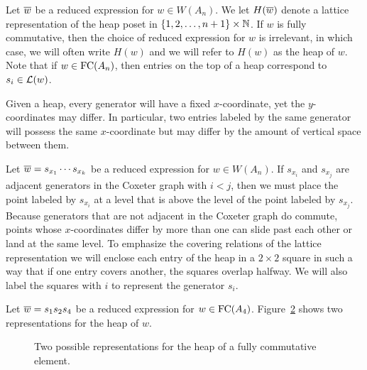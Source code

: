 Let $\overline{w}$ be a reduced expression for $w \in W(A_{n})$.  We let $H(\overline{w})$ denote a lattice representation of the heap poset in $\{1,2,\ldots,n+1\} \times \mathbb{N}$.  If $w$ is fully commutative, then the choice of reduced expression for $w$ is irrelevant, in which case, we will often write $H(w)$ and we will refer to $H(w)$ as the heap of $w$.  Note that if $w\in \operatorname{FC}(A_n)$, then entries on the top of a heap correspond to $s_i\in \mathcal{L}(w)$.

Given a heap, every generator will have a fixed $x$-co\-or\-di\-nate, yet the $y$-co\-or\-di\-nates may differ.  In particular, two entries labeled by the same generator will possess the same $x$-co\-or\-di\-nate but may differ by the amount of vertical space between them.

Let $\overline{w}=s_{x_1}\cdots s_{x_k}$ be a reduced expression for $w \in W(A_{n})$.  If $s_{x_i}$ and $s_{x_j}$ are adjacent generators in the Coxeter graph with $i<j$, then we must place the point labeled by $s_{x_i}$ at a level that is above the level of the point labeled by $s_{x_j}$.  Because generators that are not adjacent in the Coxeter graph do commute, points whose $x$-coordinates differ by more than one can slide past each other or land at the same level.  To emphasize the covering relations of the lattice representation we will enclose each entry of the heap in a $2\times 2$ square in such a way that if one entry covers another, the squares overlap halfway. We will also label the squares with $i$ to represent the generator $s_{i}$.

\begin{example}
Let $\overline{w}=s_1s_2s_4$ be a reduced expression for $w\in \operatorname{FC}(A_4)$. Figure~\ref{fig:multirep}  shows two representations for the heap of $w$. 
\begin{figure}[h]
\centering
\begin{subfigure}[b]{0.3\textwidth}
\centering
{}
\caption{}
\end{subfigure}
\begin{subfigure}[b]{0.3\textwidth}
\centering
{}
\caption{}
\label{canonical}
\end{subfigure}
\caption{Two possible representations for the heap of a fully commutative element.}
\label{fig:multirep}
\end{figure}
\end{example}

